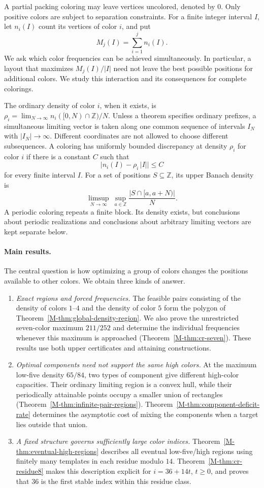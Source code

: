 \documentclass[11pt,reqno]{amsart}
\theoremstyle{plain}
\theoremstyle{plain}
\theoremstyle{plain}
\begin{document}
A partial packing coloring may leave vertices uncolored, denoted by $0$.
Only positive colors are subject to separation constraints. For a finite
integer interval $I$, let $n_i(I)$ count its vertices of color $i$, and put
\[
 M_j(I)=\sum_{i=1}^j n_i(I).
\]
We ask which color frequencies can be achieved simultaneously. In particular,
a layout that maximizes $M_j(I)/|I|$ need not leave the best possible positions
for additional colors. We study this interaction and its consequences for complete colorings.

The ordinary density of color $i$, when it exists, is
$\rho_i=\lim_{N\to\infty}n_i([0,N)\cap\mathbb Z)/N$. Unless a theorem specifies ordinary prefixes, a simultaneous
limiting vector is taken along one common sequence of intervals $I_N$ with
$|I_N|\to\infty$. Different coordinates are not allowed to choose different
subsequences. A coloring has uniformly bounded discrepancy at density $\rho_i$
for color $i$ if there is a constant $C$ such that
\[
 \bigl|n_i(I)-\rho_i\,|I|\bigr|\le C
\]
for every finite interval $I$. For a set of positions $S\subseteq\mathbb Z$, its upper Banach density is
\[
 \limsup_{N\to\infty}\ \sup_{a\in\mathbb Z}\frac{|S\cap[a,a+N)|}{N}.
\]
A periodic coloring repeats a finite block. Its density exists, but conclusions
about periodic realizations and conclusions about arbitrary limiting vectors
are kept separate below.

\paragraph{Main results.}
The central question is how optimizing a group of colors changes the
positions available to other colors. We obtain three kinds of answer.
\begin{enumerate}
\item \emph{Exact regions and forced frequencies.}
The feasible pairs consisting of the density of colors $1$--$4$ and
the density of color $5$ form the polygon of
Theorem~\ref{M-thm:global-density-region}. We also prove the unrestricted
seven-color maximum $211/252$ and determine the individual frequencies
whenever this maximum is approached (Theorem~\ref{M-thm:cr-seven}).
These results use both upper certificates and attaining constructions.
\item \emph{Optimal components need not support the same high colors.}
At the maximum low-five density $65/84$, two types of component give
different high-color capacities. Their ordinary limiting region is a
convex hull, while their periodically attainable points occupy a smaller
union of rectangles (Theorem~\ref{M-thm:infinite-pair-regions}).
Theorem~\ref{M-thm:component-deficit-rate} determines the asymptotic
cost of mixing the components when a target lies outside that union.
\item \emph{A fixed structure governs sufficiently large color indices.}
Theorem~\ref{M-thm:eventual-high-regions} describes all eventual low-five/high
regions using finitely many templates in each residue modulo $14$.
Theorem~\ref{M-thm:cr-residue8} makes this description explicit for
$i=36+14t$, $t\ge0$, and proves that $36$ is the first stable index
within this residue class.
\end{enumerate}
\end{document}
